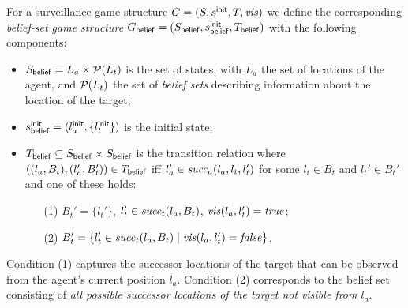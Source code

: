 For a surveillance game structure $G  = (S,s^{\mathsf{init}},T,\mathit{vis})$ we define the corresponding \emph{belief-set game structure} $G_{\mathsf{belief}}  = (S_{\mathsf{belief}},s^{\mathsf{init}}_{\mathsf{belief}},T_{\mathsf{belief}})$ with the following components:
\begin{itemize}
\item $S_{\mathsf{belief}} = L_a \times \mathcal{P}(L_t)$ is the set of states, with $L_a$ the set of locations of the agent, and $\mathcal{P}(L_t)$ the set of \emph{belief sets} describing information about the location of the target;
\item $s^{\mathsf{init}}_{\mathsf{belief}} = (l_a^{\mathsf{init}},\{l_t^{\mathsf{init}}\})$ is the initial state;
\item $T_{\mathsf{belief}} \subseteq S_{\mathsf{belief}} \times S_{\mathsf{belief}}$ is the transition relation where $((l_a, B_t),(l_a', B_t')) \in T_{\mathsf{belief}}$ iff $l_a' \in  \mathit{succ}_a(l_a,l_t,l_t')$ for some $l_t \in B_t$ and $l_t' \in B_t'$ and one of these holds:
\begin{itemize}
\item[(1)] $B_t' = \{l_t'\}$, $l_t' \in \mathit{succ}_t(l_a,B_t)$, $\mathit{vis}(l_a,l_t') = \mathit{true}$;
\item[(2)] $B_t' = \{l_t' \in \mathit{succ}_t(l_a,B_t)  \mid  \mathit{vis}(l_a,l_t') = \mathit{false} \}$.
\end{itemize}
\end{itemize}
Condition (1) captures the successor locations of the target that can be observed from the agent's current position $l_a$. Condition (2) corresponds to the belief set consisting of \emph{all possible successor locations of the target not visible from $l_a$}. 
